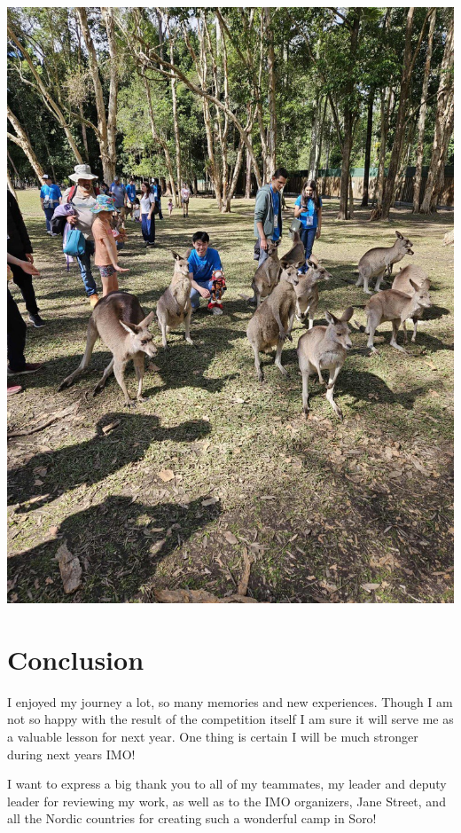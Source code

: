 \documentclass{article}
\begin{document}
\begin{center}
  \includegraphics[scale=0.13]{assets/kangoroo-many.jpg}
\end{center}

\section{Conclusion}

I enjoyed my journey a lot, so many memories and new experiences. Though I am not so happy with the result of the competition itself I am sure it will serve me as a valuable lesson for next year. One thing is certain I will be much stronger during next years IMO!

I want to express a big thank you to all of my teammates, my leader and deputy leader for reviewing my work, as well as to the IMO organizers, Jane Street, and all the Nordic countries for creating such a wonderful camp in Soro!
\end{document}
